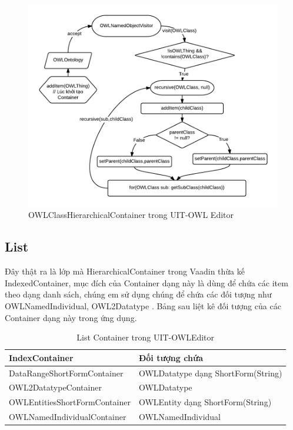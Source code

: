 \begin{figure}[h!]
	\centering
	\includegraphics[width=150mm]{Figures/owleditor_hccontainer.png}
	\caption{OWLClassHierarchicalContainer trong UIT-OWL Editor\label{overflow}}
\end{figure}
\subsection{List}
Đây thật ra là lớp mà HierarchicalContainer trong Vaadin thừa kế IndexedContainer, mục đích của Container dạng này là dùng để chứa các item theo dạng danh sách, chúng em sử dụng chúng để chứa các đối tượng như OWLNamedIndividual, OWL2Datatype . Bảng sau liệt kê đối tượng của các Container dạng này trong ứng dụng.
\begin{table}
	\centering
	\begin{tabular}{|l|l|}
		\hline
		IndexContainer  & Đối tượng chứa \\
		\hline
		DataRangeShortFormContainer	& OWLDatatype dạng ShortForm(String) \\ 
		\hline
		OWL2DatatypeContainer	& OWLDatatype  \\
		\hline
		OWLEntitiesShortFormContainer & OWLEntity dạng ShortForm(String)	\\	
		\hline
		OWLNamedIndividualContainer & OWLNamedIndividual  \\		
		\hline
	\end{tabular}
	\caption{List Container trong UIT-OWLEditor\label{overflow}}
\end{table}

